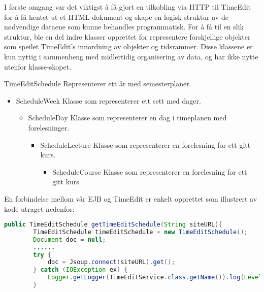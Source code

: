 \documentclass[../main.tex]{subfiles}
\begin{document}
I første omgang var det viktigst å få gjort en tilkobling via HTTP til TimeEdit for å få hentet ut et HTML-dokument og skape en logisk struktur av de nødvendige dataene som kunne behandles programmatisk. For å få til en slik struktur, ble en del indre klasser opprettet for representere forskjellige objekter som speilet TimeEdit’s innordning av objekter og tidsrammer. Disse klassene er kun nyttig i sammenheng med midlertidig organisering av data, og har ikke nytte utenfor klasse-skopet.

TimeEditSchedule \newline Representerer ett år med semesterplaner.
\begin{itemize}
\item ScheduleWeek \newline Klasse som representerer ett sett med dager.
\begin{itemize}
\item ScheduleDay \newline Klasse som representerer en dag i timeplanen med forelesninger.
\begin{itemize}
\item ScheduleLecture \newline Klasse som representerer en forelesning for ett gitt kurs.
\begin{itemize}
\item ScheduleCourse \newline Klasse som representerer en forelesning for ett gitt kurs.
\end{itemize}
\end{itemize}
\end{itemize}
\end{itemize}

En forbindelse mellom vår EJB og TimeEdit er enkelt opprettet som illustrert av kode-utraget nedenfor:

\begin{lstlisting}[language=Java, frame=single, caption={Et utdrag av en metode i TimeEditService som viser hvordan Jsoup benyttes for å hente ut ett enkelt dokument}]
public TimeEditSchedule getTimeEditSchedule(String siteURL){      
        TimeEditSchedule timeEditSchedule = new TimeEditSchedule();
        Document doc = null;
        ......
        try {
            doc = Jsoup.connect(siteURL).get();
        } catch (IOException ex) {
            Logger.getLogger(TimeEditService.class.getName()).log(Level.SEVERE, null, ex);
        }      
\end{lstlisting}
\end{document}
